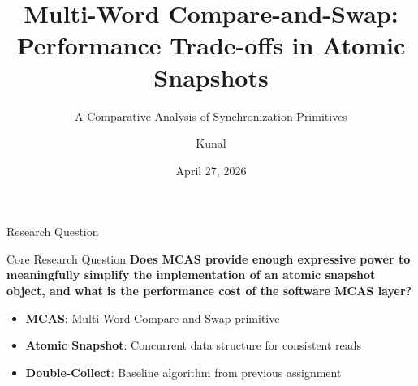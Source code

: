 \documentclass[aspectratio=169]{beamer}
\title[MCAS vs Double-Collect]{Multi-Word Compare-and-Swap: \\ Performance Trade-offs in Atomic Snapshots}
\subtitle{A Comparative Analysis of Synchronization Primitives}
\author{Kunal}
\institute{Department of Computer Science}
\date{April 27, 2026}
\begin{document}
\begin{frame}
    \titlepage
\end{frame}

\begin{frame}{Research Question}
    \begin{block}{Core Research Question}
        \centering
        \Large
        \textbf{Does MCAS provide enough expressive power to meaningfully simplify the implementation of an atomic snapshot object, and what is the performance cost of the software MCAS layer?}
    \end{block}

    \vspace{0.5cm}

    \begin{itemize}
        \item \textbf{MCAS}: Multi-Word Compare-and-Swap primitive
        \item \textbf{Atomic Snapshot}: Concurrent data structure for consistent reads
        \item \textbf{Double-Collect}: Baseline algorithm from previous assignment
    \end{itemize}
\end{frame}
\end{document}
